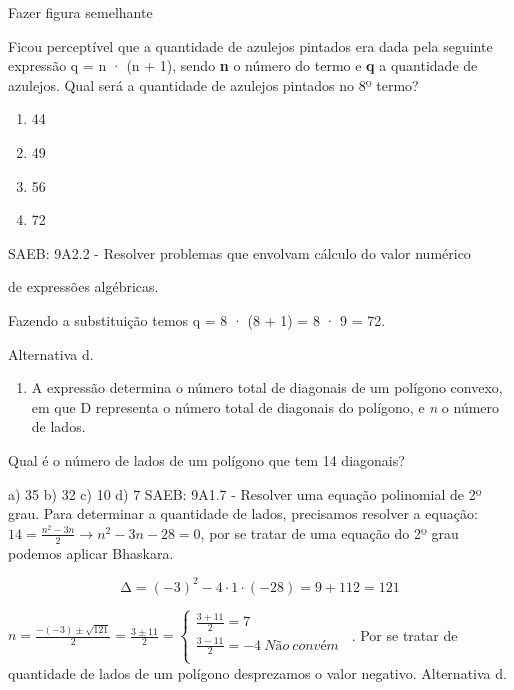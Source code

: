 \begin{escolha}
{{{\begin{escolha}
{{{{{\begin{escolha}
\begin{escolha}
{\begin{q°}
Fazer figura semelhante

Ficou perceptível que a quantidade de azulejos pintados era dada pela
seguinte expressão q = n · (n + 1), sendo \textbf{n} o número do termo e
\textbf{q} a quantidade de azulejos. Qual será a quantidade de azulejos
pintados no 8º termo?

\begin{enumerate}

\item
  44
\item
  49
\item
  56
\item
  72
\end{enumerate}

SAEB: 9A2.2 - Resolver problemas que envolvam cálculo do valor numérico

de expressões algébricas.

Fazendo a substituição temos q = 8 · (8 + 1) = 8 · 9 = 72.

Alternativa d.

\begin{enumerate}
\def\labelenumi{\arabic{enumi}.}
\setcounter{enumi}{6}
\tightlist
\item
  A expressão determina o número total de diagonais de um polígono
  convexo, em que D representa o número total de diagonais do polígono,
  e \emph{n} o número de lados.
\end{enumerate}

Qual é o número de lados de um polígono que tem 14 diagonais?

a) 35 b) 32 c) 10 d) 7 SAEB: 9A1.7 - Resolver uma equação polinomial de
2º grau. Para determinar a quantidade de lados, precisamos resolver a
equação: \(14 = \frac{n^{2} - 3n}{2} \rightarrow n^{2} - 3n - 28 = 0\),
por se tratar de uma equação do 2º grau podemos aplicar Bhaskara.

\[\mathrm{\Delta} = \left( - 3 \right)^{2} - 4 \cdot 1 \cdot \left( - 28 \right) = 9 + 112 = 121\]

\(n = \frac{- ( - 3) \pm \sqrt{121}}{2} = \frac{3 \pm 11}{2} = \left\{ \begin{matrix} \frac{3 + 11}{2} = 7\ \ \ \ \ \ \ \ \ \ \ \ \ \ \ \ \ \ \ \ \ \ \ \ \ \ \ \ \ \  \\ \frac{3 - 11}{2} = - 4\ Não\ convém \\ \end{matrix} \right.\ \).
Por se tratar de quantidade de lados de um polígono desprezamos o valor
negativo. Alternativa d.


\end{q°}}
\end{escolha}
\end{escolha}}}}}}
\end{escolha}}}}
\end{escolha}
